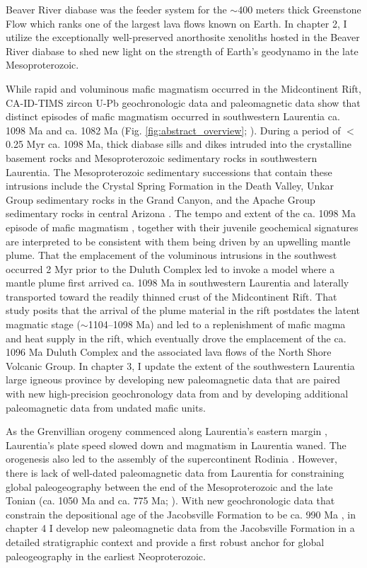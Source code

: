 Beaver River diabase was the feeder system for the $\sim$400 meters thick Greenstone Flow which ranks one of the largest lava flows known on Earth. In chapter 2, I utilize the exceptionally well-preserved anorthosite xenoliths hosted in the Beaver River diabase to shed new light on the strength of Earth's geodynamo in the late Mesoproterozoic.

While rapid and voluminous mafic magmatism occurred in the Midcontinent Rift, CA-ID-TIMS zircon U-Pb geochronologic data and paleomagnetic data show that distinct episodes of mafic magmatism occurred in southwestern Laurentia ca. 1098 Ma and ca. 1082 Ma (Fig. \ref{fig:abstract_overview}; \citealp{Mohr2024a}). During a period of $<$0.25 Myr ca. 1098 Ma, thick diabase sills and dikes intruded into the crystalline basement rocks and Mesoproterozoic sedimentary rocks in southwestern Laurentia. The Mesoproterozoic sedimentary successions that contain these intrusions include the Crystal Spring Formation in the Death Valley, Unkar Group sedimentary rocks in the Grand Canyon, and the Apache Group sedimentary rocks in central Arizona \citep{Bright2014a}. The tempo and extent of the ca. 1098 Ma episode of mafic magmatism \citep{Mohr2024a}, together with their juvenile geochemical signatures \citep{Hammond1990a, Bright2014a} are interpreted to be consistent with them being driven by an upwelling mantle plume. That the emplacement of the voluminous intrusions in the southwest occurred 2 Myr prior to the Duluth Complex led \citep{Mohr2024a} to invoke a model where a mantle plume first arrived ca. 1098 Ma in southwestern Laurentia and laterally transported toward the readily thinned crust of the Midcontinent Rift. That study posits that the arrival of the plume material in the rift postdates the latent magmatic stage ($\sim$1104--1098 Ma) and led to a replenishment of mafic magma and heat supply in the rift, which eventually drove the emplacement of the ca. 1096 Ma Duluth Complex and the associated lava flows of the North Shore Volcanic Group. In chapter 3, I update the extent of the southwestern Laurentia large igneous province by developing new paleomagnetic data that are paired with new high-precision geochronology data from \cite{Mohr2024a} and by developing additional paleomagnetic data from undated mafic units. 

As the Grenvillian orogeny commenced along Laurentia's eastern margin \citep{Swanson-Hysell2019a}, Laurentia's plate speed slowed down and magmatism in Laurentia waned. The orogenesis also led to the assembly of the supercontinent Rodinia \citep{Swanson-Hysell2023a}. However, there is lack of well-dated paleomagnetic data from Laurentia for constraining global paleogeography between the end of the Mesoproterozoic and the late Tonian (ca. 1050 Ma and ca. 775 Ma; \citealp{Swanson-Hysell2023a, Eyster2019a}). With new geochronologic data that constrain the depositional age of the Jacobsville Formation to be ca. 990 Ma \citep{Hodgin2022a}, in chapter 4 I develop new paleomagnetic data from the Jacobsville Formation in a detailed stratigraphic context and provide a first robust anchor for global paleogeography in the earliest Neoproterozoic. 

